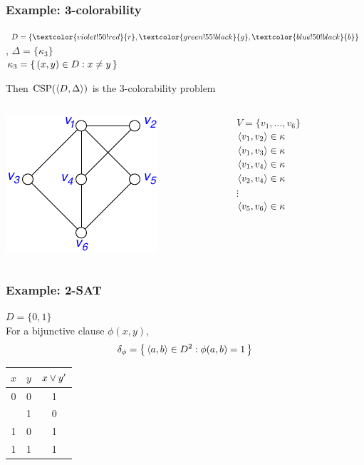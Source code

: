 \documentclass[12pt,xcolor=dvipsnames%
   ]{beamer}
\DeclareMathOperator{\CSP}{CSP}
\renewcommand{\.}{\cdot}
\newcommand{\Blue}{\textcolor{blue!50!black}}
\newcommand{\Red}{\textcolor{violet!50!red}}
\newcommand{\Green}{\textcolor{green!55!black}}
\begin{document}
\begin{frame}
  \frametitle{Example: 3-colorability}

  $D=\{\Red{r},\Green{g},\Blue{b}\}$, \quad $\Delta=\{\kappa_3\}$\\
  $\kappa_3=\left\{\,(x,y)\in D : x\neq y\,\right\}$

  Then $\CSP(\<D,\Delta\>)$ is the 3-colorability problem

  \bigskip

    \begin{columns}
      \begin{column}{1.5in}
        \includegraphics{col_csp}
      \end{column}
      \begin{column}{2in}
        $V=\{v_1,\dots,v_6\}$\\
        $\langle v_1,v_2\rangle\in \kappa$\\
        $\langle v_1,v_3\rangle\in \kappa$\\
        $\langle v_1,v_4\rangle\in \kappa$\\
        $\langle v_2,v_4\rangle\in \kappa$\\
        \qquad$\vdots$\\
        $\langle v_5,v_6\rangle\in \kappa$
      \end{column}
    \end{columns}
  \end{frame}

\begin{frame}
\frametitle{Example: 2-SAT}
$D=\{0,1\}$\\
For a bijunctive clause $\phi(x,y)$, 
\begin{equation*}
\delta_\phi= \left\{\,\langle a,b\rangle\in D^2: \phi(a,b)=1\,\right\}
\end{equation*}

\pause
\begin{tabular}{cc|c}
 $x$ & $y$ &$x\vee y'$  \\
 \hline
0 & 0 & 1\\
\visible<2>{0 & 1 & 0}\\
1 & 0 & 1\\
1 & 1 & 1
\end{tabular}

\bigskip
{}
\end{frame}
\end{document}

